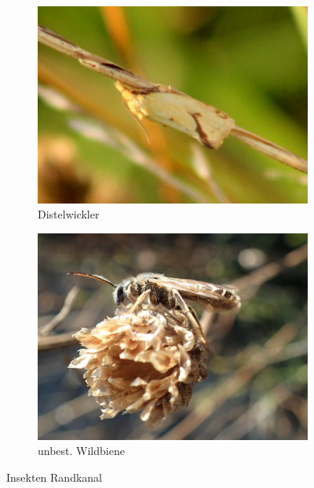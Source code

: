 \documentclass[11pt]{article}
\begin{document}
\begin{figure}[h!]
\begin{subfigure}[b]{0.45\linewidth}
    \includegraphics[width=\linewidth]{img/randkanal/distelwickler.jpg}
    \caption{Distelwickler}
  \end{subfigure}
  \begin{subfigure}[b]{0.43\linewidth}
    \includegraphics[width=\linewidth]{img/randkanal/wildbiene.jpg}
    \caption{unbest. Wildbiene}
  \end{subfigure}
  \caption{Insekten Randkanal}
\end{figure}

\clearpage
\end{document}
